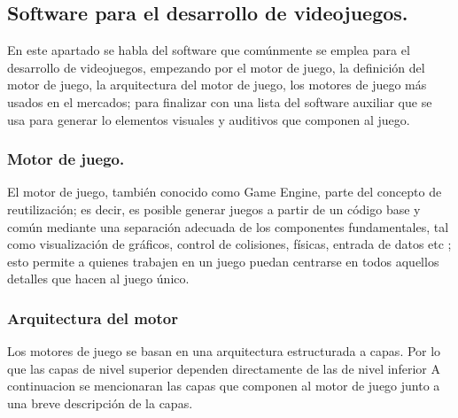 \subsection{Software para el desarrollo de videojuegos.}\label{SoftVideojue}
En este apartado se habla del software que comúnmente se emplea para el desarrollo de videojuegos, empezando por el motor de juego, la definición del motor de juego, la arquitectura del motor de juego, los motores de juego más usados en el mercados; para finalizar con una lista del software auxiliar que se usa para generar lo elementos visuales y auditivos que componen al juego.

 
\subsubsection{Motor de juego.}
El motor de juego, también conocido como Game Engine, parte del concepto de reutilización; es decir, es posible generar juegos a partir de un código base y común mediante una separación adecuada de los componentes fundamentales, tal como visualización de gráficos, control de colisiones, físicas, entrada de datos etc \cite{Ref:MutorGraf}; esto permite a quienes trabajen en un juego puedan centrarse en todos aquellos detalles que hacen al juego único.


\subsubsection{Arquitectura del motor}
Los motores de juego se basan en una arquitectura estructurada a capas. Por lo que las capas de nivel superior dependen directamente de las de nivel inferior \cite{Ref:ArquMotor} 
 A continuacion se mencionaran las capas que componen al motor de juego junto a una breve descripción de la capas.
 

